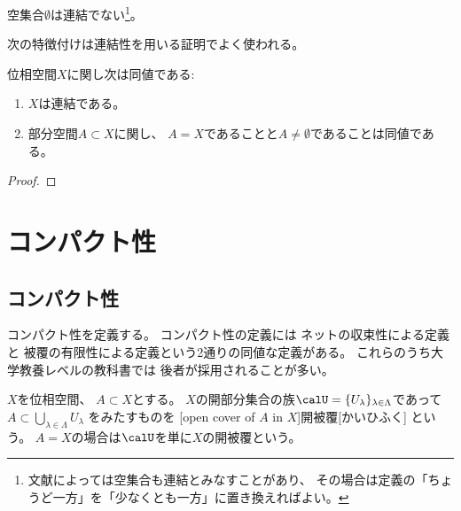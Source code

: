 \documentclass[report]{jlreq}
\begin{document}
\begin{remark}
    空集合$\emptyset$は連結でない\footnote{
        文献によっては空集合も連結とみなすことがあり、
        その場合は定義の「ちょうど一方」を「少なくとも一方」に置き換えればよい。
    }。
\end{remark}

\begin{definition}[局所連結]
    \TODO{}
\end{definition}

次の特徴付けは連結性を用いる証明でよく使われる。

\begin{proposition}[連結性の特徴付け]
    位相空間$X$に関し次は同値である:
    \begin{enumerate}
        \item $X$は連結である。
        \item 部分空間$A \subset X$に関し、
            $A = X$であることと$A \neq \emptyset$であることは同値である。
    \end{enumerate}
\end{proposition}

\begin{proof}
    \TODO{}
\end{proof}


%
\chapter{コンパクト性}

%
\section{コンパクト性}

コンパクト性を定義する。
コンパクト性の定義には
ネットの収束性による定義と
被覆の有限性による定義という2通りの同値な定義がある。
これらのうち大学教養レベルの教科書では
後者が採用されることが多い。

\begin{definition}[開被覆]
    $X$を位相空間、
    $A \subset X$とする。
    $X$の開部分集合の族$\calU = \{ U_\lambda \}_{\lambda \in \Lambda}$であって
    $A \subset \bigcup_{\lambda \in \Lambda} U_\lambda$
    をみたすものを
    [open cover of $A$ in $X$]{開被覆}[かいひふく]
    という。
    $A = X$の場合は$\calU$を単に$X$の開被覆という。
\end{definition}
\end{document}

